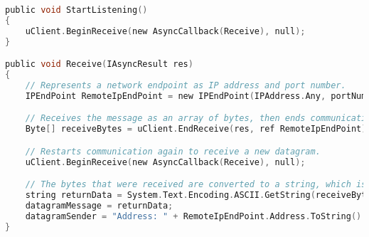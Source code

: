 \begin{lstlisting}[caption={Receiving data from host}, captionpos=b,language=C,label={lst:receivedata}]
public void StartListening()
{
    uClient.BeginReceive(new AsyncCallback(Receive), null);
}

public void Receive(IAsyncResult res)
{
    // Represents a network endpoint as IP address and port number.
    IPEndPoint RemoteIpEndPoint = new IPEndPoint(IPAddress.Any, portNumber);

    // Receives the message as an array of bytes, then ends communication with the remote endpoint.
    Byte[] receiveBytes = uClient.EndReceive(res, ref RemoteIpEndPoint);

    // Restarts communication again to receive a new datagram.
    uClient.BeginReceive(new AsyncCallback(Receive), null);

    // The bytes that were received are converted to a string, which is written to the unity debug log.
    string returnData = System.Text.Encoding.ASCII.GetString(receiveBytes);
    datagramMessage = returnData;
    datagramSender = "Address: " + RemoteIpEndPoint.Address.ToString() + ", port: " + RemoteIpEndPoint.Port.ToString();
}
\end{lstlisting}